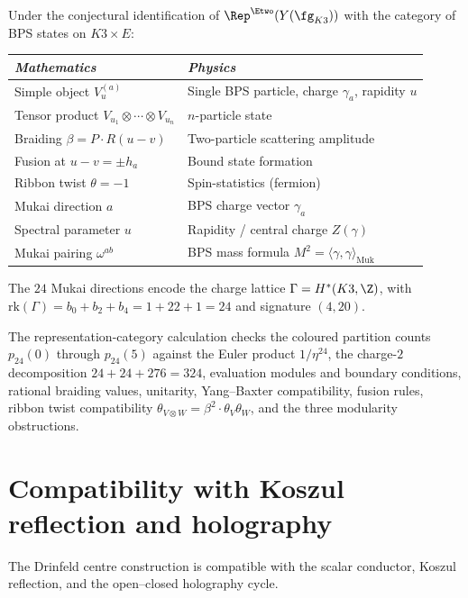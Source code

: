 \begin{remark}
\label{rem:chiral-qg-bps-dictionary}
Under the conjectural identification of $\Rep^{\Etwo}(Y(\fg_{K3}))$
with the category of BPS states on $K3 \times E$:
\begin{center}
\begin{tabular}{ll}
\toprule
\emph{Mathematics} & \emph{Physics} \\
\midrule
Simple object $V_u^{(a)}$ & Single BPS particle, charge $\gamma_a$, rapidity $u$ \\
Tensor product $V_{u_1} \otimes \cdots \otimes V_{u_n}$ & $n$-particle state \\
Braiding $\beta = P \cdot R(u - v)$ & Two-particle scattering amplitude \\
Fusion at $u - v = \pm h_a$ & Bound state formation \\
Ribbon twist $\theta = -1$ & Spin-statistics (fermion) \\
Mukai direction $a$ & BPS charge vector $\gamma_a$ \\
Spectral parameter $u$ & Rapidity / central charge $Z(\gamma)$ \\
Mukai pairing $\omega^{ab}$ & BPS mass formula $M^2 = \langle \gamma, \gamma \rangle_{\mathrm{Muk}}$ \\
\bottomrule
\end{tabular}
\end{center}
The $24$ Mukai directions encode the charge lattice
$\Gamma = H^*(K3, \Z)$, with $\mathrm{rk}(\Gamma) = b_0 + b_2 + b_4
= 1 + 22 + 1 = 24$ and signature $(4, 20)$.
\end{remark}

The representation-category calculation checks the coloured partition
counts $p_{24}(0)$ through $p_{24}(5)$ against the Euler product
$1/\eta^{24}$, the charge-$2$ decomposition
$24+24+276=324$, evaluation modules and boundary conditions, rational
braiding values, unitarity, Yang--Baxter compatibility, fusion rules,
ribbon twist compatibility
$\theta_{V\otimes W}=\beta^2\cdot\theta_V\theta_W$, and the three
modularity obstructions.


\section{Compatibility with Koszul reflection and holography}
\label{sec:drinfeld-cross-volume-bridges}

The Drinfeld centre construction is compatible with the scalar
conductor, Koszul reflection, and the open--closed holography cycle.

